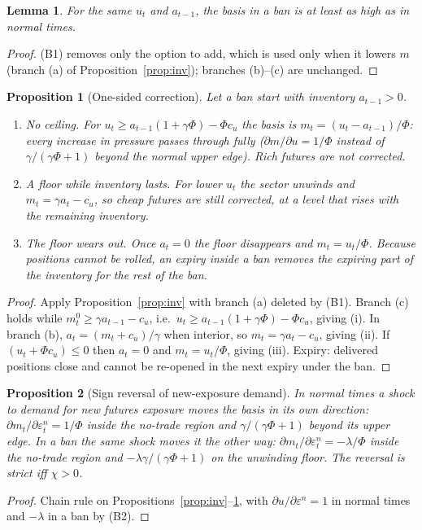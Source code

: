 \documentclass[11pt,a4paper]{article}
\theoremstyle{plain}
\newtheorem{proposition}{Proposition}
\newtheorem{lemma}{Lemma}
\theoremstyle{definition}
\theoremstyle{remark}
\begin{document}
\begin{lemma}\label{lem:weak}
For the same $u_t$ and $a_{t-1}$, the basis in a ban is at least as high as in normal times.
\end{lemma}
\begin{proof}
(B1) removes only the option to add, which is used only when it lowers $m$ (branch (a) of Proposition~\ref{prop:inv});
branches (b)--(c) are unchanged.
\end{proof}

\begin{proposition}[One-sided correction]\label{prop:onesided}
Let a ban start with inventory $a_{t-1}>0$.
\begin{enumerate}[label=(\roman*),leftmargin=1.8em,itemsep=1pt]
\item \emph{No ceiling.} For $u_t\ge a_{t-1}(1+\gamma\Phi)-\Phi c_u$ the basis is $m_t=(u_t-a_{t-1})/\Phi$: every increase
in pressure passes through fully ($\partial m/\partial u=1/\Phi$ instead of $\gamma/(\gamma\Phi+1)$ beyond the normal
upper edge). Rich futures are not corrected.
\item \emph{A floor while inventory lasts.} For lower $u_t$ the sector unwinds and $m_t=\gamma a_t-c_u$, so cheap futures
are still corrected, at a level that \emph{rises} with the remaining inventory.
\item \emph{The floor wears out.} Once $a_t=0$ the floor disappears and $m_t=u_t/\Phi$. Because positions cannot be rolled,
an expiry inside a ban removes the expiring part of the inventory for the rest of the ban.
\end{enumerate}
\end{proposition}
\begin{proof}
Apply Proposition~\ref{prop:inv} with branch (a) deleted by (B1). Branch (c) holds while
$m^0_t\ge\gamma a_{t-1}-c_u$, i.e.\ $u_t\ge a_{t-1}(1+\gamma\Phi)-\Phi c_u$, giving (i). In branch (b), $a_t=(m_t+c_u)/\gamma$
when interior, so $m_t=\gamma a_t-c_u$, giving (ii). If $(u_t+\Phi c_u)\le 0$ then $a_t=0$ and $m_t=u_t/\Phi$, giving
(iii). Expiry: delivered positions close and cannot be re-opened in the next expiry under the ban.
\end{proof}

\begin{proposition}[Sign reversal of new-exposure demand]\label{prop:flip}
In normal times a shock to demand for new futures exposure moves the basis in its own direction:
$\partial m_t/\partial\varepsilon^n_t=1/\Phi$ inside the no-trade region and $\gamma/(\gamma\Phi+1)$ beyond its upper edge.
In a ban the same shock moves it the other way: $\partial m_t/\partial\varepsilon^n_t=-\lambda/\Phi$ inside the no-trade
region and $-\lambda\gamma/(\gamma\Phi+1)$ on the unwinding floor. The reversal is strict iff $\chi>0$.
\end{proposition}
\begin{proof}
Chain rule on Propositions~\ref{prop:inv}--\ref{prop:onesided}, with $\partial u/\partial\varepsilon^n=1$ in normal times and
$-\lambda$ in a ban by (B2).
\end{proof}
\end{document}
